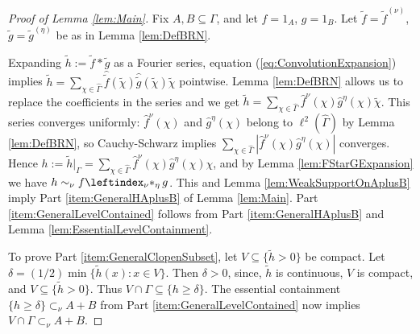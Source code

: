 \documentclass[12pt]{amsart} \usepackage{amsmath,centernot,amssymb,leftindex}
\numberwithin{theorem}{section}
\numberwithin{equation}{section}
\theoremstyle{definition}
\begin{document}
	\begin{proof}[Proof of Lemma \ref{lem:Main}]
Fix $A, B\subseteq \Gamma$, and let $f=1_{A}$, $g=1_{B}$.   Let $\tilde{f}=\tilde{f}^{(\nu)}$, $\tilde{g}=\tilde{g}^{(\eta)}$ be as in Lemma \ref{lem:DefBRN}.

Expanding $\tilde{h}:=\tilde{f}*\tilde{g}$ as a Fourier series, equation (\ref{eq:ConvolutionExpansion}) implies $\tilde{h}=\sum_{\chi\in\widehat{\Gamma}} \hat{\tilde{f}}(\tilde{\chi})\hat{\tilde{g}}(\tilde{\chi})\tilde{\chi}$ pointwise.    Lemma \ref{lem:DefBRN} allows us to replace the coefficients in the series and we get $\tilde{h}  =\sum_{\chi\in\widehat{\Gamma}} \hat{f}^{\nu}(\chi)\hat{g}^{\eta}(\chi)\tilde{\chi}$. This series converges uniformly: $\hat{f}^{\nu}(\chi)$ and $\hat{g}^{\eta}(\chi)$ belong to $\ell^{2}(\widehat{\Gamma})$ by Lemma \ref{lem:DefBRN}, so Cauchy-Schwarz implies $\sum_{\chi\in\widehat{\Gamma}} |\hat{f}^{\nu}(\chi)\hat{g}^{\eta}(\chi)|$ converges.   Hence $h:=\tilde{h}|_{\Gamma}=\sum_{\chi\in\widehat{\Gamma}} \hat{f}^{\nu}(\chi)\hat{g}^{\eta}(\chi)\chi$, and by Lemma \ref{lem:FStarGExpansion} we have $h\sim_{\nu} f\leftindex_{\nu}{*}_{\eta}\, g$.   This and Lemma \ref{lem:WeakSupportOnAplusB} imply Part \ref{item:GeneralHAplusB} of Lemma \ref{lem:Main}.  Part \ref{item:GeneralLevelContained} follows from Part \ref{item:GeneralHAplusB} and Lemma \ref{lem:EssentialLevelContainment}.
 
 To prove Part \ref{item:GeneralClopenSubset}, let $V\subseteq \{\tilde{h}>0\}$ be compact.  Let $\delta=(1/2)\min\{\tilde{h}(x):x\in V\}$.  Then $\delta>0$, since, $\tilde{h}$ is continuous, $V$ is compact, and $V\subseteq \{\tilde{h}>0\}$.  Thus $V\cap \Gamma\subseteq \{h\geq \delta\}$.  The essential containment $\{h\geq \delta\}\subset_{\nu} A+B$ from Part \ref{item:GeneralLevelContained} now implies $V\cap \Gamma \subset_{\nu} A+B$.
 



\end{proof}
\end{document}
